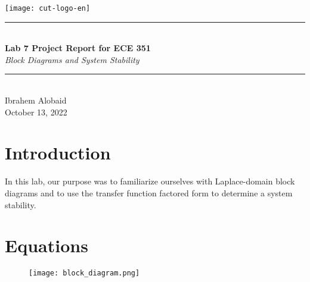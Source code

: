 \documentclass[12pt,a4paper]{article}
\newcommand{\HRule}{\rule{\linewidth}{0.5mm}}
\begin{document}
\begin{titlepage}
\begin{center}
\texttt{[image: cut-logo-en]}~\\[2cm]
\HRule \\[0.4cm]
{ \LARGE 
  \textbf{Lab 7 Project Report for ECE 351}\\[0.4cm]
  \emph{Block Diagrams and System Stability}\\[0.4cm]
}
\HRule \\[1.5cm]
{ \large
  Ibrahem Alobaid \\[0.1cm]
  October 13, 2022\\[0.1cm]
}
\vfill

\end{center}
\end{titlepage}
\newpage
\tableofcontents
{}
\newpage
\setcounter{page}{1}
\section{Introduction}\label{sec:intro}
    In this lab, our purpose was to familiarize ourselves with Laplace-domain block diagrams and to use the transfer function factored form to determine a system stability. 

\section{Equations}\label{sec:lit-rev}

\begin{figure}[h]
    \centering
    
    \texttt{[image: block\_diagram.png]}
\end{figure}\textbf{}
\end{document}
